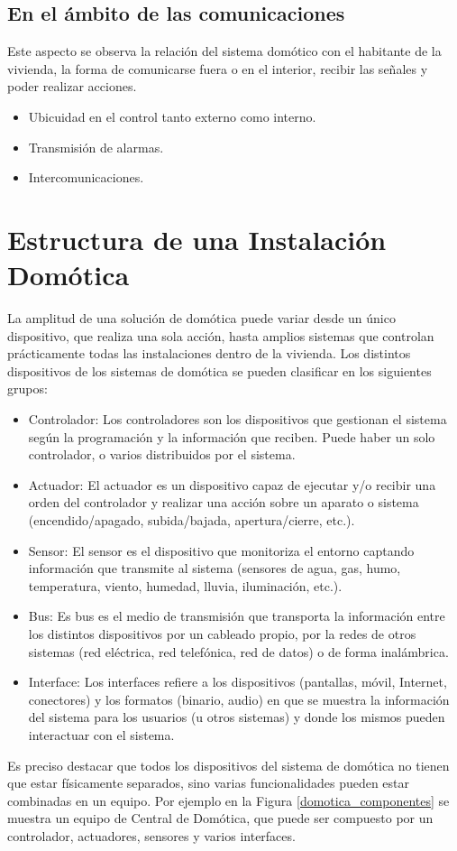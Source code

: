 \documentclass[11pt,letterpaper]{report}
\begin{document}
	\subsection{En el ámbito de las comunicaciones}
	Este aspecto se observa la relación del sistema domótico con el habitante de la vivienda, la forma de comunicarse  fuera  o en el interior, recibir las señales y poder realizar acciones.
		\begin{itemize}
		\item Ubicuidad en el control tanto externo como interno.
		\item Transmisión de alarmas.
		\item Intercomunicaciones.		
		\end{itemize}
	\section{Estructura de una Instalación Domótica}
	La amplitud de una solución de domótica puede variar desde un único dispositivo, que realiza una sola acción, hasta amplios sistemas que controlan prácticamente todas las instalaciones dentro de la vivienda\citep{casadomo:2017:Misc}. Los distintos dispositivos de los sistemas de domótica se pueden clasificar en los siguientes grupos:
		\begin{itemize}
		\item Controlador: Los controladores son los dispositivos que gestionan el sistema según la programación y la información que reciben. Puede haber un solo controlador, o varios distribuidos por el sistema. 
		\item Actuador: El actuador es un dispositivo capaz de ejecutar y/o recibir una orden del controlador y realizar una acción sobre un aparato o sistema (encendido/apagado, subida/bajada, apertura/cierre, etc.).
		\item Sensor: El sensor es el dispositivo que monitoriza el entorno captando información que transmite al sistema (sensores de agua, gas, humo, temperatura, viento, humedad, lluvia, iluminación, etc.). 
		\item Bus: Es bus es el medio de transmisión que transporta la información entre los distintos dispositivos por un cableado propio, por la redes de otros sistemas (red eléctrica, red telefónica, red de datos) o de forma inalámbrica. 
		\item Interface: Los interfaces refiere a los dispositivos (pantallas, móvil, Internet, conectores) y los formatos (binario, audio) en que se muestra la información del sistema para los usuarios (u otros sistemas) y donde los mismos pueden interactuar con el sistema.		
		\end{itemize}
		Es preciso destacar que todos los dispositivos del sistema de domótica no tienen que estar físicamente separados, sino varias funcionalidades pueden estar combinadas en un equipo. Por ejemplo en la Figura \ref{domotica_componentes} se muestra un equipo de Central de Domótica, que puede ser compuesto por un controlador, actuadores, sensores y varios interfaces. 
\end{document}
